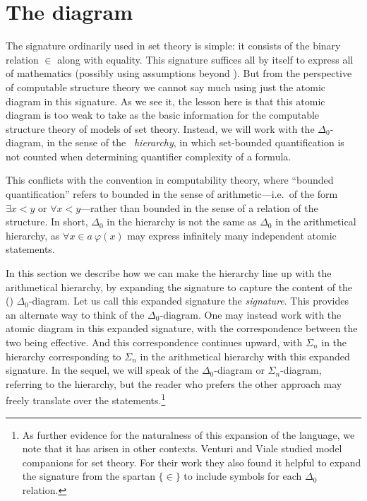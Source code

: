\documentclass{amsart}
\begin{document}
\section{The \Levy{} diagram}\label{Section.The-Levy-Diagram}

The signature ordinarily used in set theory is simple: it consists of the binary relation $\in$ along with equality. This
signature suffices all by itself to express all of mathematics (possibly using assumptions beyond \ZFC). But from the perspective of computable structure theory we cannot say much using just the atomic diagram in this signature. As we see it, the lesson here is that this atomic diagram is too weak to take as the basic information for the computable structure theory of models of set theory. Instead, we will work with the $\Delta_0$-diagram, in the sense of the \emph{\Levy\ hierarchy}, in which set-bounded quantification is not counted when determining quantifier complexity of a formula.

This conflicts with the convention in computability theory, where ``bounded quantification'' refers to bounded in the sense of arithmetic---i.e.\ of the form $\exists x<y$ or $\forall x<y$---rather than bounded in the sense of a relation of the structure. In short, $\Delta_0$ in the \Levy{} hierarchy is not the same as $\Delta_0$ in the arithmetical hierarchy, as $\forall x\in a\ \varphi(x)$ may express infinitely many independent atomic statements.


In this section we describe how we can make the \Levy{} hierarchy line up with the arithmetical hierarchy, by
expanding the signature to capture the content of the (\Levy) $\Delta_0$-diagram. Let us call this expanded signature the \emph{\Levy{} signature}. This provides an alternate way to think of the $\Delta_0$-diagram. One may instead work with the atomic diagram in this expanded signature, with the correspondence between the two being effective. And this correspondence continues upward, with $\Sigma_n$ in the \Levy{} hierarchy corresponding to $\Sigma_n$ in the arithmetical hierarchy with this expanded signature. In the sequel, we will speak of the $\Delta_0$-diagram or $\Sigma_n$-diagram, referring to the \Levy{} hierarchy, but the reader who prefers the other approach may freely translate over the statements.\footnote{As further evidence for the naturalness of this expansion of the language, we note that it has arisen in other contexts. Venturi and Viale \cite{Venture-Viale:submitted} studied model companions for set theory. For their work they also found it helpful to expand the signature from the spartan $\{\in\}$ to include symbols for each $\Delta_0$ relation.}
\end{document}
